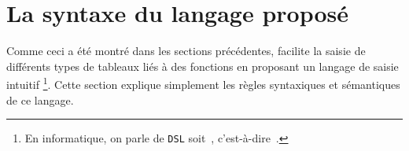 \documentclass[12pt, a4paper]{article}
\begin{document}
\section{La syntaxe du langage proposé}

Comme ceci a été montré dans les sections précédentes,  facilite la saisie de différents types de tableaux liés à des fonctions en proposant un langage de saisie intuitif
\footnote{
	En informatique, on parle de \texttt{DSL} soit \,, c'est-à-dire  \,.
}. Cette section explique simplement les règles syntaxiques et sémantiques de ce langage.
\end{document}
